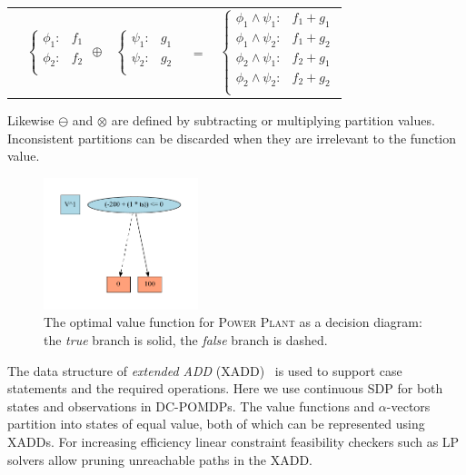 \documentclass{article}
\begin{document}
{\footnotesize 
\begin{center}
\begin{tabular}{r c c c l}
&
\hspace{-6mm} 
  $\begin{cases}
    \phi_1: & f_1 \\ 
    \phi_2: & f_2 \\ 
  \end{cases}$
$\oplus$
&
\hspace{-4mm}
  $\begin{cases}
    \psi_1: & g_1 \\ 
    \psi_2: & g_2 \\ 
  \end{cases}$
&
\hspace{-2mm} 
$ = $
&
\hspace{-2mm}
  $\begin{cases}
  \phi_1 \wedge \psi_1: & f_1 + g_1 \\ 
  \phi_1 \wedge \psi_2: & f_1 + g_2 \\ 
  \phi_2 \wedge \psi_1: & f_2 + g_1 \\ 
  \phi_2 \wedge \psi_2: & f_2 + g_2 \\ 
  \end{cases}$
\end{tabular}
\end{center}
}
\normalsize

Likewise $\ominus$ and $\otimes$ are defined by subtracting or multiplying partition values.  Inconsistent partitions can be discarded when they are irrelevant to the function value.
\begin{figure}[t]
\begin{center}
\includegraphics[width=0.4\textwidth]{v1.pdf}
\end{center}
\vspace{-3mm}
\caption{%
The optimal value function for \textsc{Power Plant}
as a decision diagram: 
the \emph{true} branch is solid, the \emph{false}
branch is dashed.} 
\end{figure}
The data structure of \emph{extended ADD} (XADD)~\cite{sanner_uai11} is used to support
case statements and the required operations.  Here we use continuous SDP for both states and observations in DC-POMDPs. The value functions and $\alpha$-vectors partition into states of equal value, both of which can be represented using XADDs. For increasing efficiency linear constraint feasibility checkers such as LP solvers allow pruning unreachable paths in the XADD.
\end{document}
